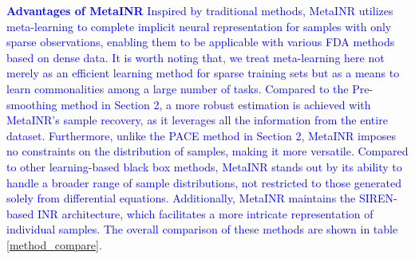 \documentclass{article}
\begin{document}
\textcolor{blue}{
\textbf{Advantages of MetaINR}
Inspired by traditional methods, MetaINR utilizes meta-learning to complete implicit neural representation for samples with only sparse observations, 
enabling them to be applicable with various FDA methods based on dense data.
It is worth noting that, we treat meta-learning here not merely as an efficient learning method for sparse training sets but as a means to learn commonalities among a large number of tasks.
Compared to the Pre-smoothing method in Section 2, a more robust estimation is achieved with MetaINR's sample recovery, as it leverages all the information from the entire dataset. 
Furthermore, unlike the PACE method in Section 2, 
MetaINR imposes no constraints on the distribution of samples, making it more versatile.
Compared to other learning-based black box methods, MetaINR stands out by its ability to handle a broader range of sample distributions, not restricted to those generated solely from differential equations.
Additionally, MetaINR maintains the SIREN-based INR architecture, which facilitates a more intricate representation of individual samples.
The overall comparison of these methods are shown in table \ref{method_compare}.
}
\end{document}
